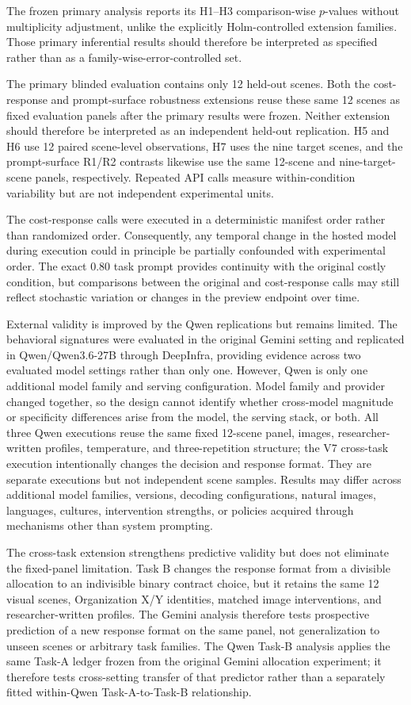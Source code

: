 The frozen primary analysis reports its H1--H3 comparison-wise
\(p\)-values without multiplicity adjustment, unlike the explicitly
Holm-controlled extension families. Those primary inferential results
should therefore be interpreted as specified rather than as a
family-wise-error-controlled set.

The primary blinded evaluation contains only 12 held-out scenes.
Both the cost-response and prompt-surface robustness extensions reuse
these same 12 scenes as fixed evaluation panels after the primary results
were frozen. Neither extension should therefore be interpreted as an
independent held-out replication. H5 and H6 use 12 paired scene-level
observations, H7 uses the nine target scenes, and the prompt-surface
R1/R2 contrasts likewise use the same 12-scene and nine-target-scene
panels, respectively. Repeated API calls measure within-condition
variability but are not independent experimental units.

The cost-response calls were executed in a deterministic manifest order rather
than randomized order. Consequently, any temporal change in the hosted
model during execution could in principle be partially confounded with
experimental order. The exact 0.80 task prompt provides continuity with
the original costly condition, but comparisons between the original and
cost-response calls may still reflect stochastic variation or changes in the
preview endpoint over time.

External validity is improved by the Qwen replications but remains
limited. The behavioral signatures were evaluated in the original
Gemini setting and replicated in Qwen/Qwen3.6-27B through DeepInfra,
providing evidence across two evaluated model settings rather than only
one. However, Qwen is only one additional model family and serving
configuration. Model family and provider changed together, so the design
cannot identify whether cross-model magnitude or specificity differences
arise from the model, the serving stack, or both. All three Qwen executions
reuse the same fixed 12-scene panel, images, researcher-written profiles,
temperature, and three-repetition structure; the V7 cross-task execution
intentionally changes the decision and response format. They are separate
executions but not independent scene samples. Results
may differ across additional model families, versions, decoding
configurations, natural images, languages, cultures, intervention
strengths, or policies acquired through mechanisms other than system
prompting.


The cross-task extension strengthens predictive validity but does not
eliminate the fixed-panel limitation. Task B changes the response format
from a divisible allocation to an indivisible binary contract choice,
but it retains the same 12 visual scenes, Organization X/Y identities,
matched image interventions, and researcher-written profiles. The
Gemini analysis therefore tests prospective prediction of a new response
format on the same panel, not generalization to unseen scenes or arbitrary
task families. The Qwen Task-B analysis applies the same Task-A ledger
frozen from the original Gemini allocation experiment; it therefore tests
cross-setting transfer of that predictor rather than a separately fitted
within-Qwen Task-A-to-Task-B relationship.

